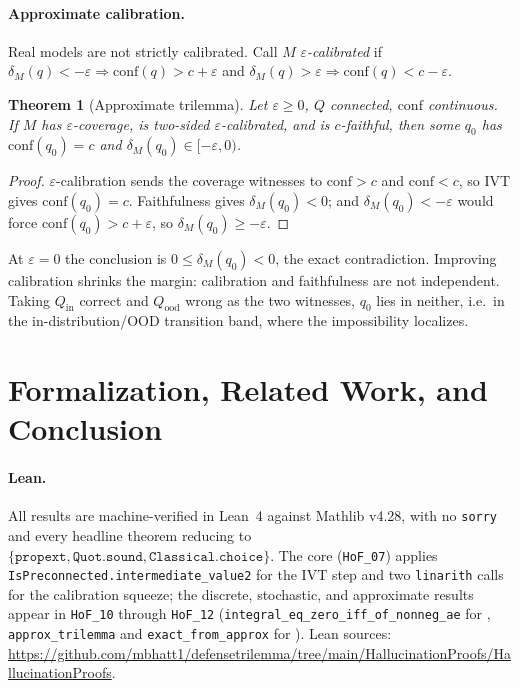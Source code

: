 \documentclass[10pt]{article}
\newtheorem{theorem}{Theorem}[section]
\newcommand{\conf}{\mathrm{conf}}
\newcommand{\proofrepo}{\url{https://github.com/mbhatt1/defensetrilemma/tree/main/HallucinationProofs/HallucinationProofs}}
\begin{document}
\paragraph{Approximate calibration.}
Real models are not strictly calibrated. Call $M$
\emph{$\varepsilon$-calibrated} if $\delta_M(q)<-\varepsilon\Rightarrow
\conf(q)>c+\varepsilon$ and $\delta_M(q)>\varepsilon\Rightarrow\conf(q)<c-\varepsilon$.

\begin{theorem}[Approximate trilemma]\label{thm:approx}
Let $\varepsilon\ge0$, $Q$ connected, $\conf$ continuous. If $M$ has
$\varepsilon$-coverage, is two-sided $\varepsilon$-calibrated, and is
$c$-faithful, then some $q_0$ has $\conf(q_0)=c$ and
$\delta_M(q_0)\in[-\varepsilon,0)$.
\end{theorem}
\begin{proof}
$\varepsilon$-calibration sends the coverage witnesses to $\conf>c$ and
$\conf<c$, so IVT gives $\conf(q_0)=c$. Faithfulness gives $\delta_M(q_0)<0$;
and $\delta_M(q_0)<-\varepsilon$ would force $\conf(q_0)>c+\varepsilon$, so
$\delta_M(q_0)\ge-\varepsilon$.
\end{proof}

At $\varepsilon=0$ the conclusion is $0\le\delta_M(q_0)<0$, the exact
contradiction. Improving calibration shrinks the margin: calibration and
faithfulness are not independent. Taking $Q_{\mathrm{in}}$ correct and
$Q_{\mathrm{ood}}$ wrong as the two witnesses, $q_0$ lies in neither, i.e.\ in
the in-distribution/OOD transition band, where the impossibility localizes.

\section{Formalization, Related Work, and Conclusion}
\label{sec:lean}

\paragraph{Lean.}
All results are machine-verified in Lean~4 against Mathlib v4.28, with no
\texttt{sorry} and every headline theorem reducing to
$\{\texttt{propext},\allowbreak \texttt{Quot.sound},\allowbreak
\texttt{Classical.choice}\}$. The core (\texttt{HoF\_07}) applies
\texttt{IsPreconnected.intermediate\_value2} for the IVT step and two
\texttt{linarith} calls for the calibration squeeze; the discrete, stochastic,
and approximate results appear in \texttt{HoF\_10} through \texttt{HoF\_12}
(\texttt{integral\_eq\_zero\_iff\_of\_nonneg\_ae} for
, \texttt{approx\_trilemma} and
\texttt{exact\_from\_approx} for ). Lean sources: \proofrepo.
\end{document}
